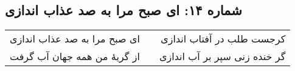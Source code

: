 \begin{center}
\section*{شماره ۱۴: ای صبح مرا به صد عذاب اندازی}
\label{sec:014}
\begin{longtable}{l p{0.5cm} r}
ای صبح مرا به صد عذاب اندازی
&&
کرجست طلب در آفتاب اندازی
\\
از گریهٔ من همه جهان آب گرفت
&&
گر خنده زنی سپر بر آب اندازی
\\
\end{longtable}
\end{center}
